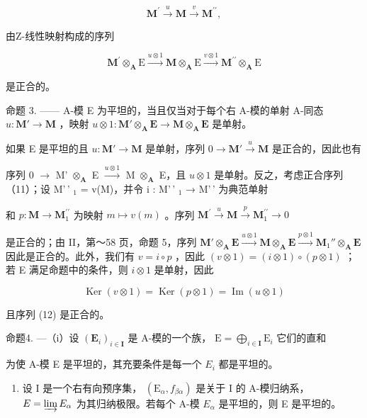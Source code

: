 \[
\mathbf {M} ^ {\prime} \xrightarrow {u} \mathbf {M} \xrightarrow {v} \mathbf {M} ^ {\prime \prime},\tag{11}
\]

由Z-线性映射构成的序列

\[
\mathbf {M} ^ {\prime} \otimes_ {\mathbf {A}} \mathrm{E} \xrightarrow {u \otimes 1} \mathbf {M} \otimes_ {\mathbf {A}} \mathrm{E} \xrightarrow {v \otimes 1} \mathbf {M} ^ {\prime \prime} \otimes_ {\mathbf {A}} \mathrm{E}\tag{12}
\]

是正合的。

命题 3. —— A-模 E 为平坦的，当且仅当对于每个右 A-模的单射 A-同态 \(u: \mathbf{M}' \to \mathbf{M}\) ，映射 \(u \otimes 1: \mathbf{M}' \otimes_{\mathbf{A}} \mathbf{E} \to \mathbf{M} \otimes_{\mathbf{A}} \mathbf{E}\) 是单射。

如果 E 是平坦的且 \(u: \mathbf{M}' \to \mathbf{M}\) 是单射，序列 \(0 \longrightarrow \mathbf{M}' \stackrel{u}{\longrightarrow} \mathbf{M}\) 是正合的，因此也有

序列 0 \(\longrightarrow\) M' \(\otimes_{\mathbf{A}}\) E \(\xrightarrow{u\otimes1}\) M \(\otimes_{\mathbf{A}}\) E，且 \(u\otimes1\) 是单射。反之，考虑正合序列（11）；设 M'\,' \(_{1}\) = v(M)，并令 i : M'\,' \(_{1}\) → M'\,' 为典范单射

和 \(p:\mathbf{M}\to\mathbf{M}_{1}^{\prime\prime}\) 为映射 \(m\mapsto v(m)\) 。序列 \(\mathbf{M}^{\prime}\xrightarrow{u}\mathbf{M}\xrightarrow{p}\mathbf{M}_{1}^{\prime\prime}\longrightarrow0\)

是正合的；由 II，第～58 页，命题 5，序列 \(\mathbf{M}' \otimes_{\mathbf{A}} \mathbf{E} \xrightarrow{u \otimes 1} \mathbf{M} \otimes_{\mathbf{A}} \mathbf{E} \xrightarrow{p \otimes 1} \mathbf{M}_{1}'' \otimes_{\mathbf{A}} \mathbf{E}\) 因此是正合的。此外，我们有 \(v = i \circ p\) ，因此 \((v \otimes 1) = (i \otimes 1) \circ (p \otimes 1)\) ；若 E 满足命题中的条件，则 \(i \otimes 1\) 是单射，因此

\[
\operatorname{Ker} (v \otimes 1) = \operatorname{Ker} (p \otimes 1) = \operatorname{Im} (u \otimes 1)
\]

且序列 (12) 是正合的。

命题4. ---（i）设 \((\mathbf{E}_i)_{i\in \mathbf{I}}\) 是 A-模的一个族， \(\mathrm{E} = \bigoplus_{i\in \mathbf{I}}\mathrm{E}_i\) 它们的直和

为使 A-模 E 是平坦的，其充要条件是每一个 \(E_{i}\) 都是平坦的。

\begin{enumerate}
\def\labelenumi{(\roman{enumi})}
\setcounter{enumi}{1}
\tightlist
\item
  设 I 是一个右有向预序集， \((\mathrm{E}_{\alpha}, f_{\beta\alpha})\) 是关于 I 的 A-模归纳系， \(E = \varinjlim E_{\alpha}\) 为其归纳极限。若每个 A-模 \(E_{\alpha}\) 是平坦的，则 E 是平坦的。
\end{enumerate}

